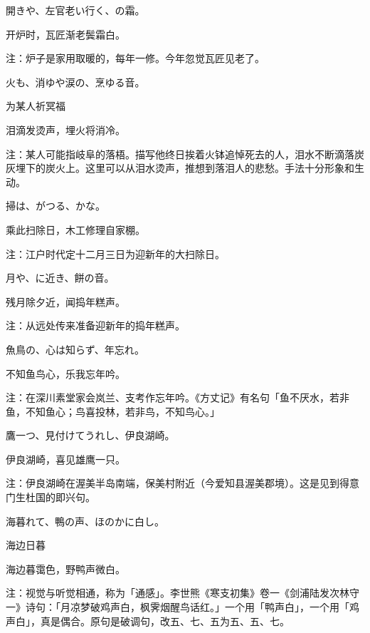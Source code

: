 \begin{haiku}
    {\FH {}開きや、左官老い行く、の霜。}

    {\FK 开炉时，瓦匠渐老鬓霜白。}

    {\FT 注：炉子是家用取暖的，每年一修。今年忽觉瓦匠见老了。}
\end{haiku}

\begin{haiku}
    {\FH {}火も、消ゆや涙の、烹ゆる音。}

    {\FK 为某人祈冥福}

    {\FK 泪滴发烫声，埋火将消冷。}

    {\FT 注：某人可能指岐阜的落梧。描写他终日挨着火钵追悼死去的人，泪水不断滴落炭灰埋下的炭火上。这里可以从泪水烫声，推想到落泪人的悲愁。手法十分形象和生动。}
\end{haiku}

\begin{haiku}
    {\FH {}掃は、がつる、かな。}

    {\FK 乘此扫除日，木工修理自家棚。}

    {\FT 注：江户时代定十二月三日为迎新年的大扫除日。}
\end{haiku}

\begin{haiku}
    {\FH 月や、に近き、餅の音。}

    {\FK 残月除夕近，闻捣年糕声。}

    {\FT 注：从远处传来准备迎新年的捣年糕声。}
\end{haiku}

\begin{haiku}
    {\FH 魚鳥の、心は知らず、年忘れ。}

    {\FK 不知鱼鸟心，乐我忘年吟。}

    {\FT 注：在深川素堂家会岚兰、支考作忘年吟。《方丈记》有名句「鱼不厌水，若非鱼，不知鱼心；鸟喜投林，若非鸟，不知鸟心。」}
\end{haiku}

\begin{haiku}
    {\FH 鷹一つ、見付けてうれし、伊良湖崎。}

    {\FK 伊良湖崎，喜见雄鹰一只。}

    {\FT 注：伊良湖崎在渥美半岛南端，保美村附近（今爱知县渥美郡境）。这是见到得意门生杜国的即兴句。}
\end{haiku}

\begin{haiku}
    {\FH 海暮れて、鴨の声、ほのかに白し。}

    {\FK 海边日暮}

    {\FK 海边暮霭色，野鸭声微白。}

    {\FT 注：视觉与听觉相通，称为「通感」。李世熊《寒支初集》卷一《剑浦陆发次林守一》诗句：「月凉梦破鸡声白，枫霁烟醒鸟话红。」一个用「鸭声白」，一个用「鸡声白」，真是偶合。原句是破调句，改五、七、五为五、五、七。}
\end{haiku}

